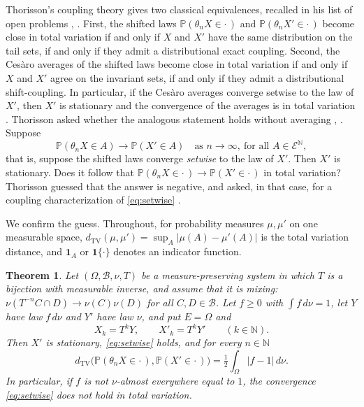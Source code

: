 \documentclass[11pt]{amsart}
\newtheorem{theorem}{Theorem}[section]
\theoremstyle{definition}
\theoremstyle{remark}
\newcommand{\N}{\mathbb N}
\newcommand{\Prob}{\mathbb P}
\newcommand{\cE}{\mathcal E}
\newcommand{\cB}{\mathcal B}
\newcommand{\dtv}{d_{\mathrm{TV}}}
\newcommand{\one}{\mathbf 1}
\begin{document}
Thorisson's coupling theory \cite{Tho00} gives two classical equivalences, recalled in his list of open problems
\cite{Tho11}, \cite[Theorem~3.1]{ThoPre}. First, the shifted laws $\Prob(\theta_nX\in\cdot\,)$ and $\Prob(\theta_nX'\in\cdot\,)$
become close in total variation if and only if $X$ and $X'$ have the same distribution on the tail sets, if and only if
they admit a distributional exact coupling. Second, the Ces\`aro averages of the shifted laws become close in total
variation if and only if $X$ and $X'$ agree on the invariant sets, if and only if they admit a distributional
shift-coupling. In particular, if the Ces\`aro averages converge setwise to the law of $X'$, then $X'$ is stationary and
the convergence of the averages is in total variation \cite[Corollary~3.1]{ThoPre}. Thorisson asked whether the
analogous statement holds without averaging \cite{Tho11}, \cite[Problem~3.1]{ThoPre}. Suppose
\begin{equation}\label{eq:setwise}
\Prob(\theta_nX\in A)\to\Prob(X'\in A)\quad\text{as }n\to\infty,\ \text{for all }A\in\cE^{\N},
\end{equation}
that is, suppose the shifted laws converge \emph{setwise} to the law of $X'$. Then $X'$ is stationary. Does it follow that $\Prob(\theta_nX\in\cdot\,)\to\Prob(X'\in\cdot\,)$ in total variation?
Thorisson guessed that the answer is negative, and asked, in that case, for a coupling characterization of
\eqref{eq:setwise} \cite[Problem~3.2]{ThoPre}.

We confirm the guess. Throughout, for probability measures $\mu,\mu'$ on one measurable space,
$\dtv(\mu,\mu')=\sup_A|\mu(A)-\mu'(A)|$ is the total variation distance, and $\one_A$ or $\one\{\cdot\}$
denotes an indicator function.

\begin{theorem}\label{thm:main}
Let $(\Omega,\cB,\nu,T)$ be a measure-preserving system in which $T$ is a bijection with measurable inverse, and assume
that it is mixing: $\nu(T^{-n}C\cap D)\to\nu(C)\nu(D)$ for all $C,D\in\cB$. Let $f\ge0$ with $\int f\,d\nu=1$, let
$Y$ have law $f\,d\nu$ and $Y'$ have law $\nu$, and put $E=\Omega$ and
\[
X_k=T^kY,\qquad X'_k=T^kY'\qquad(k\in\N).
\]
Then $X'$ is stationary, \eqref{eq:setwise} holds, and for every $n\in\N$
\[
\dtv\bigl(\Prob(\theta_nX\in\cdot\,),\Prob(X'\in\cdot\,)\bigr)=\tfrac12\int_\Omega|f-1|\,d\nu .
\]
In particular, if $f$ is not $\nu$-almost everywhere equal to $1$, the convergence \eqref{eq:setwise} does not hold in
total variation.
\end{theorem}
\end{document}
